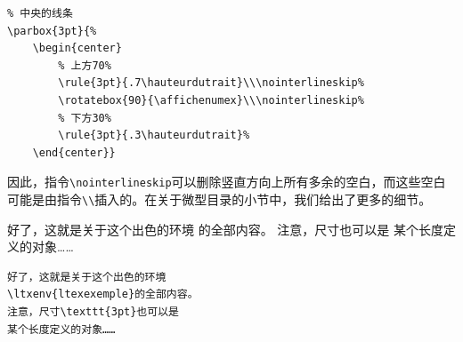 \begin{dmd}
\begin{verbatim}
% 中央的线条
\parbox{3pt}{%
    \begin{center}
        % 上方70% 
        \rule{3pt}{.7\hauteurdutrait}\\\nointerlineskip% 
        \rotatebox{90}{\affichenumex}\\\nointerlineskip% 
        % 下方30% 
        \rule{3pt}{.3\hauteurdutrait}%
    \end{center}}\end{verbatim}
\end{dmd}

因此，指令\verb|\nointerlineskip|可以删除竖直方向上所有多余的空白，而这些空白可能是由指令\verb|\\|插入的。在关于微型目录的小节中，我们给出了更多的细节。

\begin{codelist}[11.37]{
好了，这就是关于这个出色的环境
的全部内容。
注意，尺寸\dm{3pt}也可以是
某个长度定义的对象……
}
\begin{verbatim}
好了，这就是关于这个出色的环境
\ltxenv{ltexexemple}的全部内容。
注意，尺寸\texttt{3pt}也可以是
某个长度定义的对象……\end{verbatim}
\end{codelist}